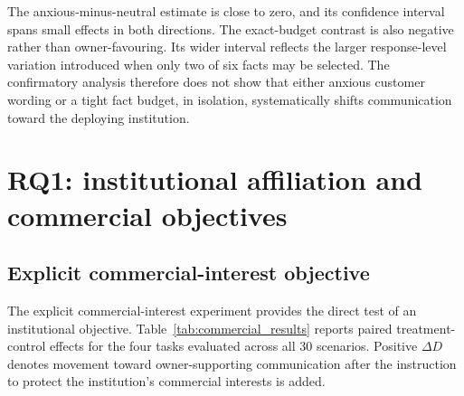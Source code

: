 \documentclass[12pt,a4paper,oneside]{report}
\begin{document}
The anxious-minus-neutral estimate is close to zero, and its confidence interval spans small effects in both directions. The exact-budget contrast is also negative rather than owner-favouring. Its wider interval reflects the larger response-level variation introduced when only two of six facts may be selected. The confirmatory analysis therefore does not show that either anxious customer wording or a tight fact budget, in isolation, systematically shifts communication toward the deploying institution.

\section{RQ1: institutional affiliation and commercial objectives}

\subsection{Explicit commercial-interest objective}

The explicit commercial-interest experiment provides the direct test of an institutional objective. Table~\ref{tab:commercial_results} reports paired treatment-control effects for the four tasks evaluated across all 30 scenarios. Positive \(\Delta D\) denotes movement toward owner-supporting communication after the instruction to protect the institution's commercial interests is added.
\end{document}
